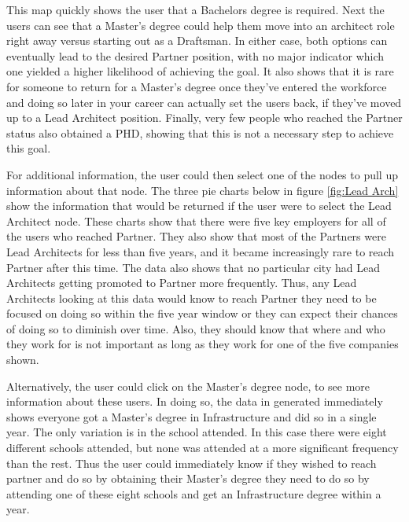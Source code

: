 This map quickly shows the user that a Bachelors degree is required.  Next the
users can see that a Master's degree could help them move into an architect
role right away versus starting out as a Draftsman.  In either case, both
options can eventually lead to the desired Partner position, with no major
indicator which one yielded a higher likelihood of achieving the goal.  It also
shows that it is rare for someone to return for a Master's degree once they've
entered the workforce and doing so later in your career can actually set the
users back, if they've moved up to a Lead Architect position.  Finally, very
few people who reached the Partner status also obtained a PHD, showing that this
is not a necessary step to achieve this goal.

For additional information, the user could then select one of the nodes to pull
up information about that node.  The three pie charts below in figure
\ref{fig:Lead Arch} show the information that would be returned if the user
were to select the Lead Architect node.  These charts show that there were five
key employers for all of the users who reached Partner.  They also show that
most of the Partners were Lead Architects for less than five years, and it
became increasingly rare to reach Partner after this time.  The data also shows
that no particular city had Lead Architects getting promoted to Partner more
frequently.  Thus, any Lead Architects looking at this data would know to reach
Partner they need to be focused on doing so within the five year window or they
can expect their chances of doing so to diminish over time.  Also, they should
know that where and who they work for is not important as long as they work for
one of the five companies shown.

Alternatively, the user could click on the Master's degree node, to see more
information about these users.  In doing so, the data in generated immediately
shows everyone got a Master's degree in Infrastructure and did so in a single
year.  The only variation is in the school attended.  In this case there were
eight different schools attended, but none was attended at a more significant
frequency than the rest.  Thus the user could immediately know if they wished to
reach partner and do so by obtaining their Master's degree they need to do so by
attending one of these eight schools and get an Infrastructure degree within a
year.



